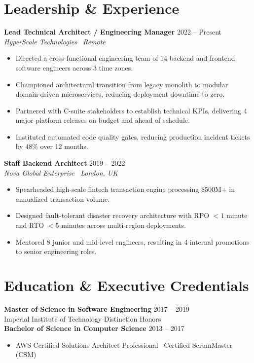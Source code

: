 \documentclass[10pt,a4paper]{article}
\begin{document}
\section{Leadership \& Experience}
\textbf{Lead Technical Architect / Engineering Manager} \hfill 2022 -- Present\\
\textit{HyperScale Technologies \textbar\ Remote}
\begin{itemize}
    \item Directed a cross-functional engineering team of 14 backend and frontend software engineers across 3 time zones.
    \item Championed architectural transition from legacy monolith to modular domain-driven microservices, reducing deployment downtime to zero.
    \item Partnered with C-suite stakeholders to establish technical KPIs, delivering 4 major platform releases on budget and ahead of schedule.
    \item Instituted automated code quality gates, reducing production incident tickets by 48\% over 12 months.
\end{itemize}

\vspace{3pt}
\textbf{Staff Backend Architect} \hfill 2019 -- 2022\\
\textit{Nova Global Enterprise \textbar\ London, UK}
\begin{itemize}
    \item Spearheaded high-scale fintech transaction engine processing \$500M+ in annualized transaction volume.
    \item Designed fault-tolerant disaster recovery architecture with RPO $< 1$ minute and RTO $< 5$ minutes across multi-region deployments.
    \item Mentored 8 junior and mid-level engineers, resulting in 4 internal promotions to senior engineering roles.
\end{itemize}

\section{Education \& Executive Credentials}
\textbf{Master of Science in Software Engineering} \hfill 2017 -- 2019\\
Imperial Institute of Technology \hfill Distinction Honors\\
\textbf{Bachelor of Science in Computer Science} \hfill 2013 -- 2017
\begin{itemize}
    \item AWS Certified Solutions Architect Professional \textbar\ Certified ScrumMaster (CSM)
\end{itemize}
\end{document}
